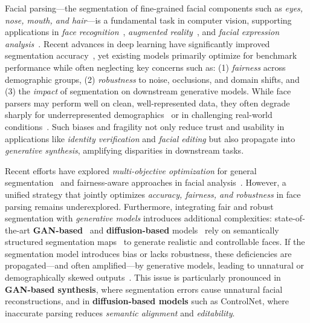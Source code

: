 Facial parsing—the segmentation of fine-grained facial components such as \textit{eyes, nose, mouth, and hair}—is a fundamental task in computer vision, supporting applications in \textit{face recognition}~\cite{wang2021deep}, \textit{augmented reality}~\cite{lee2012implementing}, and \textit{facial expression analysis}~\cite{corneanu2016survey}. Recent advances in deep learning have significantly improved segmentation accuracy~\cite{chen2017deeplab, lin2020towards}, yet existing models primarily optimize for benchmark performance while often neglecting key concerns such as: (1) \textit{fairness} across demographic groups, (2) \textit{robustness} to noise, occlusions, and domain shifts, and (3) the \textit{impact} of segmentation on downstream generative models. While face parsers may perform well on clean, well-represented data, they often degrade sharply for underrepresented demographics~\cite{buolamwini2018gender, grother2019face, park2022fair} or in challenging real-world conditions~\cite{ghiasi2014parsing, geirhos2018imagenet, hendrycks2019benchmarking}. Such biases and fragility not only reduce trust and usability in applications like \textit{identity verification} and \textit{facial editing} but also propagate into \textit{generative synthesis}, amplifying disparities in downstream tasks.

Recent efforts have explored \textit{multi-objective optimization} for general segmentation~\cite{kendall2018multi, standley2020tasks, sener2018multi} and fairness-aware approaches in facial analysis~\cite{merler2019diversity, navon2020auxiliary}. However, a unified strategy that jointly optimizes \textit{accuracy, fairness, and robustness} in face parsing remains underexplored. Furthermore, integrating fair and robust segmentation with \textit{generative models} introduces additional complexities: state-of-the-art \textbf{GAN-based}~\cite{goodfellow2014generative} and \textbf{diffusion-based} models~\cite{zhang2023adding} rely on semantically structured segmentation maps~\cite{park2019semantic, wang2018high} to generate realistic and controllable faces. If the segmentation model introduces bias or lacks robustness, these deficiencies are propagated—and often amplified—by generative models, leading to unnatural or demographically skewed outputs~\cite{menon2020pulse, tan2020improving, friedrich2023fair}. This issue is particularly pronounced in \textbf{GAN-based synthesis}, where segmentation errors cause unnatural facial reconstructions, and in \textbf{diffusion-based models} such as ControlNet, where inaccurate parsing reduces \textit{semantic alignment} and \textit{editability}.

